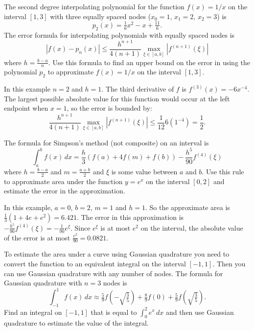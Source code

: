\documentclass[11pt]{exam}
\begin{document}
\begin{questions}
\newpage


\question The second degree interpolating polynomial for the function $f(x) = 1/x$ on the interval $[1,3]$ with three equally spaced nodes ($x_0 = 1$, $x_1=2$, $x_2 =3$) is 
$$p_2(x) = \tfrac{1}{6}x^2 - x + \tfrac{11}{6}.$$
The error formula for interpolating polynomials with equally spaced nodes is 
$$|f(x)-p_n(x)| \le \frac{h^{n+1}}{4(n+1)} \max_{\xi \in [a,b]} |f^{(n+1)}(\xi)|$$ 
where $h = \tfrac{b-a}{n}$.  Use this formula to find an upper bound on the error in using the polynomial $p_2$ to approximate $f(x) = 1/x$ on the interval $[1,3]$.  
\begin{solution}
In this example $n = 2$ and $h = 1$.  The third derivative of $f$ is $f^{(3)}(x) = -6 x^{-4}$. The largest possible absolute value for this function would occur at the left endpoint when $x = 1$, so the error is bounded by:
$$ \frac{h^{n+1}}{4(n+1)} \max_{\xi \in [a,b]} |f^{(n+1)}(\xi)| \le \frac{1}{12} 6(1^{-4}) = \frac{1}{2}.$$ 
\end{solution}
\vfill



\question The formula for Simpson's method (not composite) on an interval is 
$$\int_a^b f(x) \, dx = \frac{h}{3} \left(f(a) + 4 f(m) + f(b) \right) - \frac{h^5}{90} f^{(4)}(\xi)$$
where $h = \frac{b-a}{2}$ and $m = \frac{a+b}{2}$ and $\xi$ is some value between $a$ and $b$. Use this rule to approximate area under the function $y = e^x$ on the interval $[0,2]$ and estimate the error in the approximation.

\begin{solution}
In this example, $a=0$, $b=2$, $m=1$ and $h=1$.  So the approximate area is $\frac{1}{3}(1+4e+e^2) = 6.421$.  The error in this approximation is $- \frac{h^5}{90} f^{(4)}(\xi) = -\frac{1}{90}e^\xi$.  Since $e^\xi$ is at most $e^2$ on the interval, the absolute value of the error is at most $\frac{e^2}{90} = 0.0821$.  
\end{solution}
\vfill

\newpage

\question To estimate the area under a curve using Gaussian quadrature you need to convert the function to an equivalent integral on the interval $[-1,1]$.  Then you can use Gaussian quadrature with any number of nodes.  The formula for Gaussian quadrature with $n=3$ nodes is
$$\int_{-1}^1 f(x) \, dx \approx \tfrac{5}{9}f\left(-\sqrt{\tfrac{3}{5}}\right) + \tfrac{8}{9} f(0) + \tfrac{5}{9} f\left(\sqrt{\tfrac{3}{5}}\right).$$
Find an integral on $[-1,1]$ that is equal to $\int_0^2 e^x \,dx$ and then use Gaussian quadrature to estimate the value of the integral.  


\end{questions}
\end{document}
